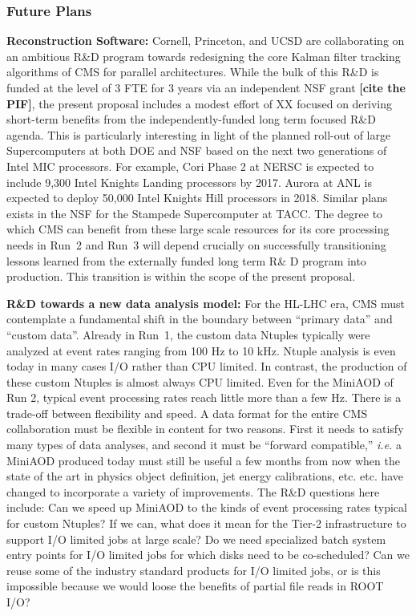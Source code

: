\documentclass[11pt,a4paper]{article}
\begin{document}
\subsubsection{Future Plans}

{\bf Reconstruction Software:} Cornell, Princeton, and UCSD are
collaborating on an ambitious R\&D program towards redesigning the core
Kalman filter tracking algorithms of CMS for parallel architectures.  While
the bulk of this R\&D is funded at the level of 3 FTE for 3 years via an
independent NSF grant {\bf [cite the PIF]}, the present proposal includes a
modest effort of XX focused on deriving short-term benefits from the
independently-funded long term focused R\&D agenda.  This is particularly
interesting in light of the planned roll-out of large Supercomputers at
both DOE and NSF based on the next two generations of Intel MIC
processors. For example, Cori Phase 2 at NERSC is expected to include 9,300 Intel
Knights Landing processors by 2017. Aurora at ANL is expected to deploy
50,000 Intel Knights Hill processors in 2018.  Similar plans exists in the
NSF for the Stampede Supercomputer at TACC.  The degree to which CMS can
benefit from these large scale resources for its core processing needs in
Run~2 and Run~3 will depend crucially on successfully transitioning lessons
learned from the externally funded long term R\& D program into
production. This transition is within the scope of the present proposal.

{\bf R\&D towards a new data analysis model:} For the HL-LHC era, CMS must
contemplate a fundamental shift in the boundary between ``primary data''
and ``custom data''.  Already in Run~1, the custom data Ntuples typically
were analyzed at event rates ranging from 100 Hz to 10 kHz.  Ntuple
analysis is even today in many cases I/O rather than CPU limited. In
contrast, the production of these custom Ntuples is almost always CPU
limited. Even for the MiniAOD of Run 2, typical event processing rates
reach little more than a few Hz.  There is a trade-off between flexibility
and speed. A data format for the entire CMS collaboration must be
flexible in content for two reasons. First it needs to satisfy many types
of data analyses, and second it must be ``forward compatible,'' {\it i.e.} a
MiniAOD produced today must still be useful a few months from now when the
state of the art in physics object definition, jet energy calibrations,
etc. etc. have changed to incorporate a variety of improvements. The R\&D
questions here include: Can we speed up MiniAOD to the kinds of event
processing rates typical for custom Ntuples? If we can, what does it mean
for the Tier-2 infrastructure to support I/O limited jobs at large scale?
Do we need specialized batch system entry points for I/O limited jobs
for which disks need to be co-scheduled?  Can we reuse some of the industry
standard products for I/O limited jobs, or is this impossible because we
would loose the benefits of partial file reads in ROOT I/O?
\end{document}
